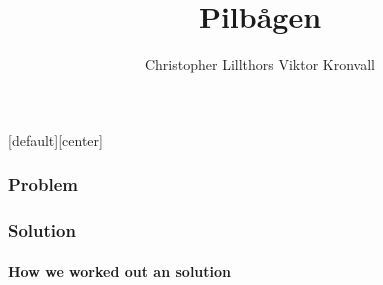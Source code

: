 \documentclass[xcolor=dvipsnames]{beamer}
\author{Christopher Lillthors Viktor Kronvall}
\title{Pilbågen}
\begin{document}
\maketitle
{}[default][center]
\begin{frame}
\frametitle{Problem}
\end{frame}
\begin{frame}
\frametitle{Solution}
\framesubtitle{How we worked out an solution}
\end{frame}
\end{document}
